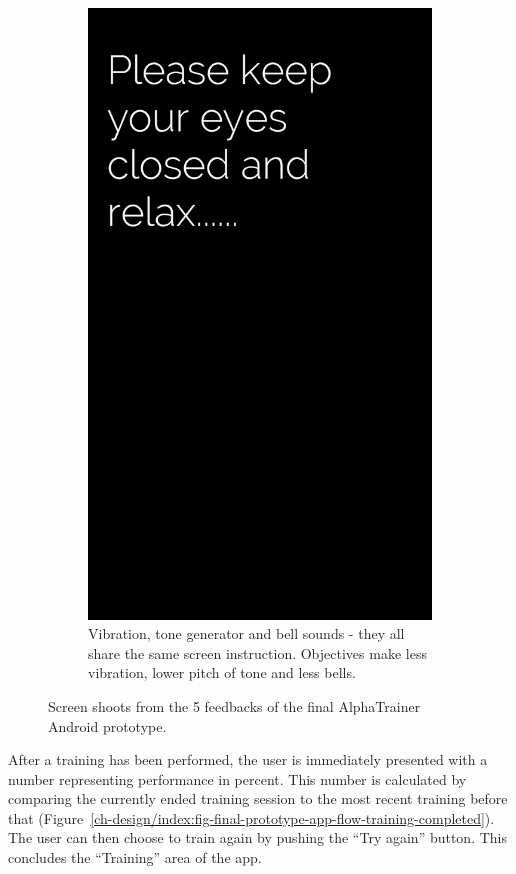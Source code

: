 \documentclass[a4paper,10pt,english,lof,lot,twoside]{puthesis}
\begin{document}
\begin{figure}
\begin{subfigure}[t]{0.30\linewidth}
\includegraphics[width=0.800\linewidth]{final-prototype-feedback-3-4-5.png}
\caption[Vibration, tone generator and bell sounds.]{Vibration, tone generator and bell sounds - they all share the
same screen instruction. Objectives make less vibration, lower
pitch of tone and less bells.}\label{ch-design/index:fig-final-prototype-feedback-3-4-5}\end{subfigure}
\caption[Screen shoots from the 5 feedbacks of the final Android prototype.]{Screen shoots from the 5 feedbacks of the final AlphaTrainer Android prototype.}\label{ch-design/index:fig-final-prototype-app-feedbacks}

\end{figure}


After a training has been performed, the user is immediately presented with a
number representing performance in percent. This number is calculated by comparing the
currently ended training session to the most recent training before that (Figure \ref{ch-design/index:fig-final-prototype-app-flow-training-completed}). The user can
then choose to train again by pushing the ``Try again'' button. This concludes the
``Training'' area of the app.
\end{document}
